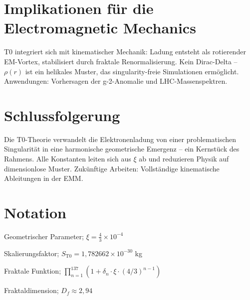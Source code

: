 	\section{Implikationen für die Electromagnetic Mechanics}
	\label{sec:emm}
	
	T0 integriert sich mit kinematischer Mechanik: Ladung entsteht als rotierender EM-Vortex, stabilisiert durch fraktale Renormalisierung. Kein Dirac-Delta – $\rho(r)$ ist ein helikales Muster, das singularity-freie Simulationen ermöglicht. Anwendungen: Vorhersagen der g-2-Anomalie und LHC-Massenspektren.
	
	\section{Schlussfolgerung}
	
	Die T0-Theorie verwandelt die Elektronenladung von einer problematischen Singularität in eine harmonische geometrische Emergenz – ein Kernstück des Rahmens. Alle Konstanten leiten sich aus $\xi$ ab und reduzieren Physik auf dimensionlose Muster. Zukünftige Arbeiten: Vollständige kinematische Ableitungen in der EMM.
	
	\appendix
	\section{Notation}
	\begin{description}[leftmargin=1cm]
		\item[$\xi$] Geometrischer Parameter; $\xi = \frac{4}{3} \times 10^{-4}$
		\item[$S_{\mathrm{T0}}$] Skalierungsfaktor; $S_{\mathrm{T0}} = 1{,}782662 \times 10^{-30}$ kg
		\item[$f_{\text{fractal}}$] Fraktale Funktion; $\prod_{n=1}^{137} (1 + \delta_n \cdot \xi \cdot (4/3)^{n-1})$
		\item[$D_f$] Fraktaldimension; $D_f \approx 2{,}94$
	\end{description}

